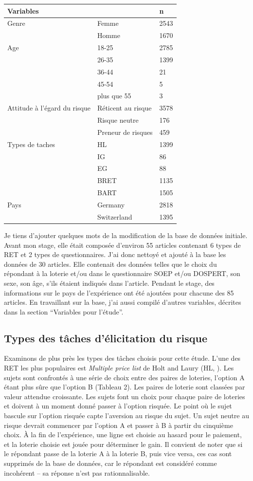 \documentclass[12pt]{article}
\begin{document}
\begin{longtable}[]{@{}lll@{}}
\toprule()
Variables & & n \\
\midrule()
\endhead
Genre & Femme & 2543 \\
& Homme & 1670 \\
Age & 18-25 & 2785 \\
& 26-35 & 1399 \\
& 36-44 & 21 \\
& 45-54 & 5 \\
& plus que 55 & 3 \\
Attitude à l'égard du risque & Réticent au risque & 3578 \\
& Risque neutre & 176 \\
& Preneur de risques & 459 \\
Types de taches & HL & 1399 \\
& IG & 86 \\
& EG & 88 \\
& BRET & 1135 \\
& BART & 1505 \\
Pays & Germany & 2818 \\
& Switzerland & 1395 \\
\bottomrule()
\end{longtable}

Je tiens d'ajouter quelques mots de la modification de la base de
données initiale. Avant mon stage, elle était composée d'environ 55
articles contenant 6 types de RET et 2 types de questionnaires. J'ai
donc nettoyé et ajouté à la base les données de 30 articles. Elle
contenait des données telles que le choix du répondant à la loterie
et/ou dans le questionnaire SOEP et/ou DOSPERT, son sexe, son âge, s'ils
étaient indiqués dans l'article. Pendant le stage, des informations sur
le pays de l'expérience ont été ajoutées pour chacune des 85 articles.
En travaillant sur la base, j'ai aussi compilé d'autres variables,
décrites dans la section ``Variables pour l'étude''.

\subsection{Types des tâches d'élicitation du risque}

Examinons de plus près les types des tâches choisis pour cette étude.
L'une des RET les plus populaires est \emph{Multiple price list} de Holt
and Laury (HL, \citet{Holt2002}). Les sujets sont confrontés à une série
de choix entre des paires de loteries, l'option A étant plus sûre que
l'option B (Tableau 2). Les paires de loterie sont classées par valeur
attendue croissante. Les sujets font un choix pour chaque paire de
loteries et doivent à un moment donné passer à l'option risquée. Le
point où le sujet bascule sur l'option risquée capte l'aversion au
risque du sujet. Un sujet neutre au risque devrait commencer par
l'option A et passer à B à partir du cinquième choix. À la fin de
l'expérience, une ligne est choisie au hasard pour le paiement, et la
loterie choisie est jouée pour déterminer le gain. Il convient de noter
que si le répondant passe de la loterie A à la loterie B, puis vice
versa, ces cas sont supprimés de la base de données, car le répondant
est considéré comme incohérent -- sa réponse n'est pas rationnalisable.
\end{document}
